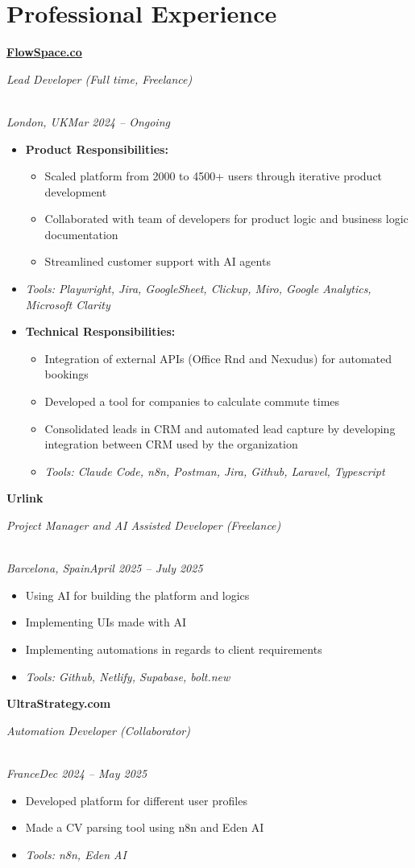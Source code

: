 \documentclass[a4paper,10pt]{article}
\newcommand{\role}[4]{\vspace{3pt}\noindent\hspace{0.6em}\parbox[t]{0.38\textwidth}{\raggedright\textbf{#1}}\hfill\parbox[t]{0.58\textwidth}{\raggedleft\textit{#2}}\\{\textit{#3}\hfill\textit{#4}}\vspace{1pt}}
\begin{document}
\section{Professional Experience}
\role{\href{https://flowspace.co}{FlowSpace.co}}{Lead Developer (Full time, Freelance)}{London, UK}{Mar 2024 -- Ongoing}
\begin{itemize}
\item \textbf{Product Responsibilities:}
\begin{itemize}[label=--]
\item Scaled platform from 2000 to 4500+ users through iterative product development
\item Collaborated with team of developers for product logic and business logic documentation
\item Streamlined customer support with AI agents
\end{itemize}
\item \textit{Tools: Playwright, Jira, GoogleSheet, Clickup, Miro, Google Analytics, Microsoft Clarity}
\item \textbf{Technical Responsibilities:}
\begin{itemize}[label=--]
\item Integration of external APIs (Office Rnd and Nexudus) for automated bookings
\item Developed a tool for companies to calculate commute times
\item Consolidated leads in CRM and automated lead capture by developing integration between CRM used by the organization
\item \textit{Tools: Claude Code, n8n, Postman, Jira, Github, Laravel, Typescript}
\end{itemize}
\end{itemize}

\role{Urlink}{Project Manager and AI Assisted Developer (Freelance)}{Barcelona, Spain}{April 2025 -- July 2025}
\begin{itemize}
\item Using AI for building the platform and logics
\item Implementing UIs made with AI
\item Implementing automations in regards to client requirements
\item \textit{Tools: Github, Netlify, Supabase, bolt.new}
\end{itemize}

\role{UltraStrategy.com}{Automation Developer (Collaborator)}{France}{Dec 2024 -- May 2025}
\begin{itemize}
\item Developed platform for different user profiles
\item Made a CV parsing tool using n8n and Eden AI
\item \textit{Tools: n8n, Eden AI}
\end{itemize}
\end{document}
